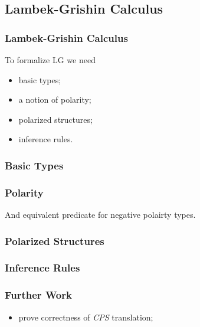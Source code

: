 \documentclass[utf8x]{beamer}
\begin{document}
\subsection{Lambek-Grishin Calculus}

\begin{frame}
\frametitle{Lambek-Grishin Calculus}

To formalize LG we need
\begin{itemize}
\item basic types;
\item a notion of polarity;
\item polarized structures;
\item inference rules.
\end{itemize}
\end{frame}

\begin{frame}
\frametitle{Basic Types}


\end{frame}

\begin{frame}
\frametitle{Polarity}


And equivalent predicate for negative polairty types.
\end{frame}

\begin{frame}
\frametitle{Polarized Structures}

\end{frame}

\begin{frame}
\frametitle{Inference Rules}
\end{frame}

\begin{frame}
\frametitle{Further Work}

\begin{itemize}
\item prove correctness of \emph{CPS} translation;
\end{itemize}
\end{frame}
\end{document}
